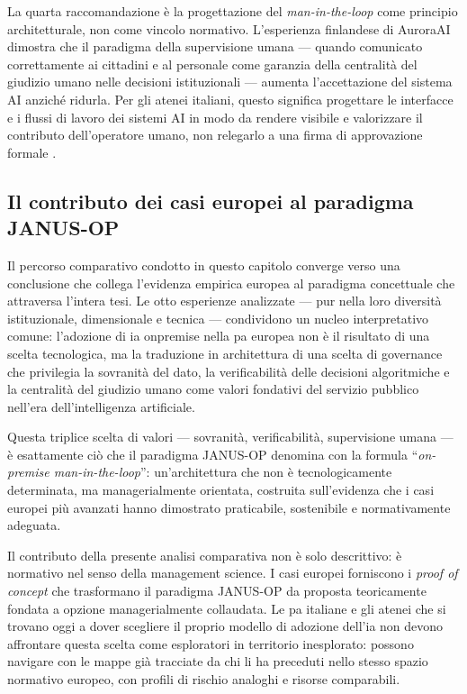 La quarta raccomandazione è la progettazione del
\textit{man-in-the-loop} come principio architetturale, non come vincolo
normativo. L'esperienza finlandese di AuroraAI dimostra che il paradigma
della supervisione umana --- quando comunicato correttamente ai cittadini e al
personale come garanzia della centralità del giudizio umano nelle decisioni
istituzionali --- aumenta l'accettazione del sistema AI anziché ridurla. Per
gli atenei italiani, questo significa progettare le interfacce e i flussi di
lavoro dei sistemi AI in modo da rendere visibile e valorizzare il contributo
dell'operatore umano, non relegarlo a una firma di approvazione formale
\parencite{Ahn2022}.

\subsection{Il contributo dei casi europei al paradigma JANUS-OP}

Il percorso comparativo condotto in questo capitolo converge verso una
conclusione che collega l'evidenza empirica europea al paradigma concettuale che
attraversa l'intera tesi. Le otto esperienze analizzate --- pur nella loro
diversità istituzionale, dimensionale e tecnica --- condividono un nucleo
interpretativo comune: l'adozione di \gls{ia} \gls{onpremise} nella \gls{pa} europea
non è il risultato di una scelta tecnologica, ma la traduzione in architettura
di una scelta di governance che privilegia la sovranità del dato, la
verificabilità delle decisioni algoritmiche e la centralità
del giudizio umano come valori fondativi del servizio pubblico nell’era
dell’intelligenza artificiale.

Questa triplice scelta di valori --- sovranità, verificabilità, supervisione
umana --- è esattamente ciò che il paradigma JANUS-OP denomina con la formula
``\textit{on-premise man-in-the-loop}'': un’architettura che non è
tecnologicamente determinata, ma managerialmente orientata, costruita
sull’evidenza che i casi europei più avanzati hanno dimostrato praticabile,
sostenibile e normativamente adeguata.

Il contributo della presente analisi comparativa non è solo descrittivo: è
normativo nel senso della management science. I casi europei forniscono
i \textit{proof of concept} che trasformano il paradigma JANUS-OP da proposta
teoricamente fondata a opzione managerialmente collaudata. Le \gls{pa} italiane e gli
atenei che si trovano oggi a dover scegliere il proprio modello di adozione dell’\gls{ia}
non devono affrontare questa scelta come esploratori in territorio inesplorato:
possono navigare con le mappe già tracciate da chi li ha preceduti nello stesso
spazio normativo europeo, con profili di rischio analoghi e risorse comparabili.
